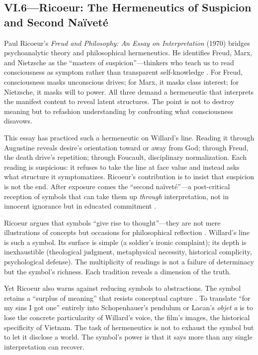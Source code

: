 \subsection*{VI.6—Ricoeur: The Hermeneutics of Suspicion and Second Naïveté}
\label{ssec:vi-ricoeur}

Paul Ricoeur's \textit{Freud and Philosophy: An Essay on Interpretation} (1970) bridges
psychoanalytic theory and philosophical hermeneutics. He identifies Freud, Marx, and Nietzsche
as the ``masters of suspicion''---thinkers who teach us to read consciousness as symptom
rather than transparent self-knowledge \parencite{RicoeurSymbol1970}. For Freud, consciousness
masks unconscious drives; for Marx, it masks class interest; for Nietzsche, it masks will to
power. All three demand a hermeneutic that interprets the manifest content to reveal latent
structures. The point is not to destroy meaning but to refashion understanding by confronting
what consciousness disavows.

This essay has practiced such a hermeneutic on Willard's line. Reading it through Augustine
reveals desire's orientation toward or away from God; through Freud, the death drive's
repetition; through Foucault, disciplinary normalization. Each reading is suspicious: it
refuses to take the line at face value and instead asks what structure it symptomatizes.
Ricoeur's contribution is to insist that suspicion is not the end. After exposure comes the
``second naïveté''---a post-critical reception of symbols that can take them up
\emph{through} interpretation, not in innocent ignorance but in educated commitment
\parencite{RicoeurSymbol1970}.

Ricoeur argues that symbols ``give rise to thought''---they are not mere illustrations of
concepts but occasions for philosophical reflection \parencite[p.~347]{RicoeurSymbol1970}.
Willard's line is such a symbol. Its surface is simple (a soldier's ironic complaint); its
depth is inexhaustible (theological judgment, metaphysical necessity, historical complicity,
psychological defense). The multiplicity of readings is not a failure of determinacy but the
symbol's richness. Each tradition reveals a dimension of the truth.

Yet Ricoeur also warns against reducing symbols to abstractions. The symbol retains a
``surplus of meaning'' that resists conceptual capture \parencite{RicoeurSymbol1970}. To
translate ``for my sins I got one'' entirely into Schopenhauer's pendulum or Lacan's
\emph{objet a} is to lose the concrete particularity of Willard's voice, the film's images,
the historical specificity of Vietnam. The task of hermeneutics is not to exhaust the symbol
but to let it disclose a world. The symbol's power is that it says more than any single
interpretation can recover.

